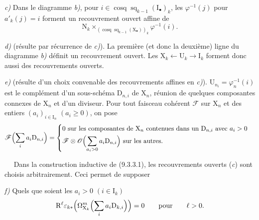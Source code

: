 \documentclass[11pt,leqno]{article}
\newcommand{\Page}[1]{\ifvmode\noindent\else\unskip\ \fi{\footnotesize\textcolor{gray}{[p.\,#1]}}\ \ignorespaces}
\begin{document}
\textit{c)} Dans le diagramme \textit{b)}, pour \(i\in\operatorname{cosq}\operatorname{sq}_{k-1}(\mathrm{I}_{\bullet})_{k}\), les \(\varphi^{-1}(j)\) pour \(a'_{k}(j)=i\) forment un recouvrement ouvert affine de
\[
\mathrm{N}_{k}
\times_{(\operatorname{cosq}\operatorname{sq}_{k-1}(\mathrm{X}_{\bullet}))_{k}}
\varphi^{-1}(i).
\]

\textit{d)} (résulte par récurrence de \textit{c)}). La première (et donc la deuxième) ligne du diagramme \textit{b)} définit un recouvrement ouvert. Les \(\mathrm{X}_{k}\leftarrow\mathrm{U}_{k}\to\mathrm{I}_{k}\) forment donc aussi des recouvrements ouverts.

\textit{e)} (résulte d’un choix convenable des recouvrements affines en \textit{c)}). \(\mathrm{U}_{n_i}=\varphi_{n}^{-1}(i)\) est le complément d’un sous-schéma \(\mathrm{D}_{n,i}\) de \(\mathrm{X}_{n}\), réunion de quelques composantes connexes de \(\mathrm{X}_{n}\) et d’un diviseur. Pour tout faisceau cohérent \(\mathscr{F}\) sur \(\mathrm{X}_{n}\) et des entiers \((a_{i})_{i\in\mathrm{I}_{n}}\) \((a_{i}\geq0)\), on pose
\[
\mathscr{F}\Bigl(\sum_{i}a_{i}\mathrm{D}_{n,i}\Bigr)
=
\begin{cases}
0\text{ sur les composantes de }\mathrm{X}_{n}
 \text{ contenues dans un }\mathrm{D}_{n,i}\text{ avec }a_{i}>0\\[3pt]
\displaystyle
\mathscr{F}\otimes\mathscr{O}\Bigl(\sum_{a_{i}>0}a_{i}\mathrm{D}_{n,i}\Bigr)
 \text{ sur les autres.}
\end{cases}
\]

\Page{52}
Dans la construction inductive de (9.3.3.1), les recouvrements ouverts (\textit{c}) sont choisis arbitrairement. Ceci permet de supposer

\textit{f)} Quels que soient les \(a_{i}>0\) \((i\in\mathrm{I}_{k})\)
\[
\mathrm{R}^{\ell}\varepsilon_{k*}
\Bigl(\Omega_{\mathrm{X}_{k}}^{m}\Bigl(\sum_{i}a_{i}\mathrm{D}_{k,i}\Bigr)\Bigr)=0
\qquad\text{pour}\qquad\ell>0.
\]
\end{document}
